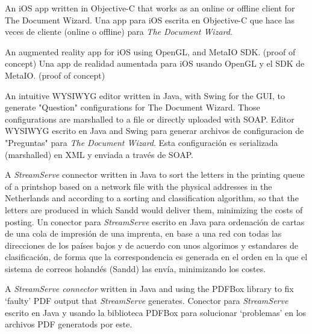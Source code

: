 \documentclass[11pt,a4paper,sans]{moderncv}
\begin{document}

    {\ml
    {An iOS app written in Objective-C that works as an online or offline client
    for The Document Wizard.}
    {Una app para iOS escrita en Objective-C que hace las veces de cliente
    (online o offline) para \textit{The Document Wizard}.}
}


    {\ml
    {An augmented reality app for iOS using OpenGL, and MetaIO SDK. (proof of concept)}
    {Una app de realidad aumentada para iOS usando OpenGL y el SDK de MetaIO. (proof of concept)}
}


    {\ml
    {An intuitive WYSIWYG editor written in Java, with Swing for the GUI, to
    generate "Question" configurations for The Document Wizard.  Those
    configurations are marshalled to a file or directly uploaded with SOAP.}
    {Editor WYSIWYG escrito en Java and Swing para generar archivos de
    configuracion de "Preguntas" para \textit{The Document Wizard}. Esta
    configuración es serializada (marshalled) en XML y enviada a través de
    SOAP.}
}


    {\ml
    {A \textit{StreamServe} connector written in Java to sort the letters in the
    printing queue of a printshop based on a network file with the physical
    addresses in the Netherlands and according to a sorting and classification
    algorithm, so that the letters are produced in which Sandd would deliver
    them, minimizing the costs of posting.}
    {Un conector para \textit{StreamServe} escrito en Java para ordenación de
    cartas de una cola de impresión de una imprenta, en base a una red con
    todas las direcciones de los países bajos y de acuerdo con unos algorimos y
    estandares de clasificación, de forma que la correspondencia es generada en
    el orden en la que el sistema de correos holandés (Sandd) las envía,
    minimizando los costes.}
}


    {\ml
    {A \textit{StreamServe connector} written in Java and using the PDFBox
    library to fix `faulty' PDF output that \textit{StreamServe} generates.}
    {Conector para \textit{StreamServe} escrito en Java y usando la biblioteca
    PDFBox para solucionar `problemas' en los archivos PDF generatods por
    este.}
}
\end{document}
